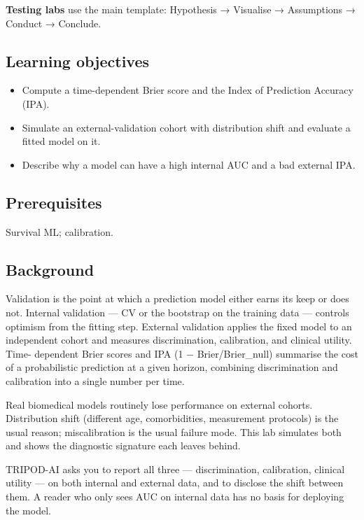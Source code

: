 \documentclass[
]{article}
\author{}
\date{\vspace{-2.5em}}
\providecommand{\tightlist}{%
  \setlength{\itemsep}{0pt}\setlength{\parskip}{0pt}}
\begin{document}
\textbf{Testing labs} use the main template: Hypothesis → Visualise →
Assumptions → Conduct → Conclude.

\subsection{Learning objectives}\label{learning-objectives}

\begin{itemize}
\tightlist
\item
  Compute a time-dependent Brier score and the Index of Prediction
  Accuracy (IPA).
\item
  Simulate an external-validation cohort with distribution shift and
  evaluate a fitted model on it.
\item
  Describe why a model can have a high internal AUC and a bad external
  IPA.
\end{itemize}

\subsection{Prerequisites}\label{prerequisites}

Survival ML; calibration.

\subsection{Background}\label{background}

Validation is the point at which a prediction model either earns its
keep or does not. Internal validation --- CV or the bootstrap on the
training data --- controls optimism from the fitting step. External
validation applies the fixed model to an independent cohort and measures
discrimination, calibration, and clinical utility. Time- dependent Brier
scores and IPA (1 − Brier/Brier\_null) summarise the cost of a
probabilistic prediction at a given horizon, combining discrimination
and calibration into a single number per time.

Real biomedical models routinely lose performance on external cohorts.
Distribution shift (different age, comorbidities, measurement protocols)
is the usual reason; miscalibration is the usual failure mode. This lab
simulates both and shows the diagnostic signature each leaves behind.

TRIPOD-AI asks you to report all three --- discrimination, calibration,
clinical utility --- on both internal and external data, and to disclose
the shift between them. A reader who only sees AUC on internal data has
no basis for deploying the model.
\end{document}
